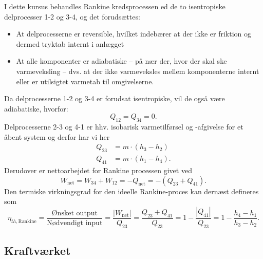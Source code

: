 I dette kursus behandles Rankine kredsprocessen ed de to isentropiske delprocesser 1-2 og 3-4, og det forudsættes:
\begin{itemize}
  \item At delprocesserne er reversible, hvilket indebærer at der ikke er friktion og dermed tryktab internt i anlægget
  \item At alle komponenter er adiabatiske -- på nær der, hvor der skal ske varmeveksling -- dvs. at der ikke varmeveksles mellem komponenterne internt eller er utilsigtet varmetab til omgivelserne.
\end{itemize}
Da delprocesserne 1-2 og 3-4 er forudsat isentropiske, vil de også være adiabatiske, hvorfor:
\[ 
Q_{12} = Q_{34} = 0
.\]
Delprocesserne 2-3 og 4-1 er hhv. isobarisk varmetilførsel og -afgivelse for et åbent system og derfor har vi her
\begin{align*}
  Q_{23} &= m \cdot \left( h_3 - h_2 \right) \\
  Q_{41} &= m \cdot \left( h_1 - h_4 \right)
.\end{align*}
Derudover er nettoarbejdet for Rankine processen givet ved
\[ 
W_{\mathrm{net}} = W_{34} + W_{12} = -Q_{\mathrm{net}} = - \left( Q_{23} + Q_{41} \right)
.\]
Den termiske virkningsgrad for den ideelle Rankine-proces kan dernæst defineres som
\[ 
\eta_{th, \mathrm{Rankine}} = \frac{\text{Ønsket output}}{\text{Nødvendigt input}} = \frac{|W_{\mathrm{net}}|}{Q_{23}} = \frac{Q_{23} + Q_{41}}{Q_{23}} = 1 - \frac{|Q_{41}|}{Q_{23}} = 1 - \frac{h_4 - h_1}{h_3 - h_2}
.\]

\subsection{Kraftværket}

